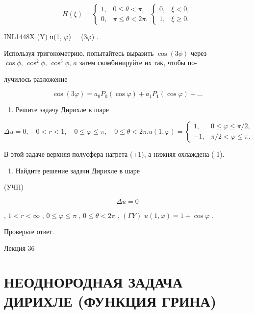 \documentclass[
  ukrainian,
]{article}
\providecommand{\tightlist}{%
  \setlength{\itemsep}{0pt}\setlength{\parskip}{0pt}}
\begin{document}
\[
H(\xi) =
\begin{cases} 1, & 0 \le \theta < \pi, \\ 0, & \pi \le \theta < 2\pi. \end{cases}
\begin{cases} 0, & \xi < 0, \\ 1, & \xi \geqslant 0. \end{cases}
\]

INL1448X (\Gamma Y) u(1, \(\varphi\)) = \cos(3\(\varphi\)) .

Используя тригонометрию, попытайтесь выразить \(\cos{(3\phi)}\) через
\(\cos{\phi}, \, \cos^2{\phi}, \, \cos^3{\phi}, \, a\) затем
скомбинируйте их так, чтобы по-

лучилось разложение

\[
\cos(3\varphi) = a_0 P_0(\cos\varphi) + a_1 P_1(\cos\varphi) + \dots
\]

\begin{enumerate}
\def\labelenumi{\arabic{enumi}.}
\setcounter{enumi}{4}
\tightlist
\item
  Решите задачу Дирихле в шаре
\end{enumerate}

\[
\Delta u = 0, \quad 0 < r < 1, \quad 0 \le \varphi \le \pi, \quad 0 \le \theta < 2\pi.
u(1, \varphi) =
\begin{cases} 1, & 0 \le \varphi \le \pi/2, \\ -1, & \pi/2 < \varphi \le \pi. \end{cases}
\]

В этой задаче верхняя полусфера нагрета (+1), а нижняя охлаждена (-1).

\begin{enumerate}
\def\labelenumi{\arabic{enumi}.}
\setcounter{enumi}{5}
\tightlist
\item
  Найдите решение задачи Дирихле в шаре
\end{enumerate}

(УЧП)

\[
\Delta u = 0
\]

, \(1 < r < \infty\) , \(0 \le \varphi \le \pi\) ,
\(0 \le \theta < 2\pi\) , \((\Gamma Y)\)
\(u(1, \varphi) = 1 + \cos \varphi\) .

Проверьте ответ.

Лекция 36

\section{НЕОДНОРОДНАЯ ЗАДАЧА ДИРИХЛЕ (ФУНКЦИЯ
ГРИНА)}\label{ux43dux435ux43eux434ux43dux43eux440ux43eux434ux43dux430ux44f-ux437ux430ux434ux430ux447ux430-ux434ux438ux440ux438ux445ux43bux435-ux444ux443ux43dux43aux446ux438ux44f-ux433ux440ux438ux43dux430}
\end{document}
